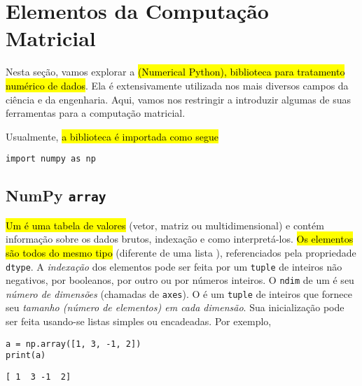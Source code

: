 
\section{Elementos da Computação Matricial}\label{sec_matricial}

Nesta seção, vamos explorar a \hl{{\numpy} (Numerical Python), biblioteca para tratamento numérico de dados}. Ela é extensivamente utilizada nos mais diversos campos da ciência e da engenharia. Aqui, vamos nos restringir a introduzir algumas de suas ferramentas para a computação matricial.

Usualmente, \hl{a biblioteca é importada como segue}

\begin{lstlisting}
import numpy as np
\end{lstlisting}

\subsection{NumPy \texttt{array}}

\hl{Um {\PYTHONnumpyDOTarray} é uma tabela de valores} (vetor, matriz ou multidimensional) e contém informação sobre os dados brutos, indexação e como interpretá-los. \hl{Os elementos são todos do mesmo tipo} (diferente de uma lista {\python}), referenciados pela propriedade \texttt{dtype}. A \emph{indexação} dos elementos pode ser feita por um \texttt{tuple} de inteiros não negativos, por booleanos, por outro {\PYTHONnumpyDOTarray} ou por números inteiros. O \texttt{ndim} de um {\PYTHONnumpyDOTarray} é seu \emph{número de dimensões} (chamadas de \texttt{axes}). O {\PYTHONnumpyDOTndarrayDOTshape} é um \texttt{tuple} de inteiros que fornece seu \emph{tamanho (número de elementos) em cada dimensão}. Sua inicialização pode ser feita usando-se listas simples ou encadeadas. Por exemplo,

\begin{lstlisting}
a = np.array([1, 3, -1, 2])
print(a)
\end{lstlisting}

\begin{verbatim}
[ 1  3 -1  2]
\end{verbatim}

